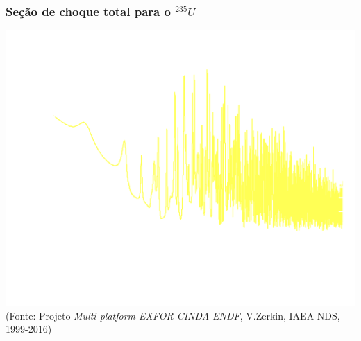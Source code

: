 \documentclass[svgnames,smaller,table]{beamer}
\begin{document}
{

  \begin{frame}
  \frametitle{Seção de choque total para o $^{235}U$}
  \centering\includegraphics[scale=0.15]{../figuras/cu-neg.png}
  \\
  \centering
  \scriptsize{(Fonte: Projeto \textit{Multi-platform EXFOR-CINDA-ENDF}, V.Zerkin, IAEA-NDS, 1999-2016)}
\end{frame}
}
%
%
%
\end{document}
